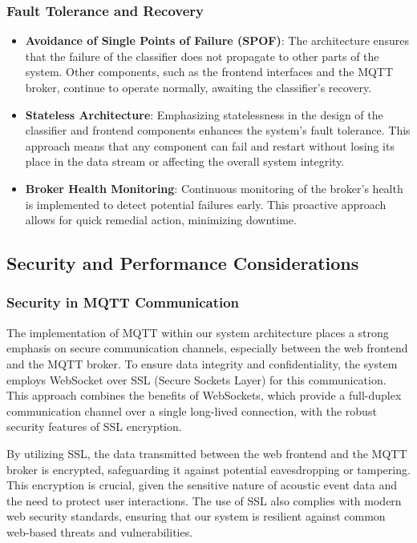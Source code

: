 \subsubsection{Fault Tolerance and Recovery}
\begin{itemize}
  \item \textbf{Avoidance of Single Points of Failure (SPOF)}: The architecture ensures that the failure of the classifier does not propagate to other parts of the system. Other components, such as the frontend interfaces and the MQTT broker, continue to operate normally, awaiting the classifier's recovery.
  \item \textbf{Stateless Architecture}: Emphasizing statelessness in the design of the classifier and frontend components enhances the system's fault tolerance. This approach means that any component can fail and restart without losing its place in the data stream or affecting the overall system integrity.
  \item \textbf{Broker Health Monitoring}: Continuous monitoring of the broker's health is implemented to detect potential failures early. This proactive approach allows for quick remedial action, minimizing downtime.
\end{itemize}

\subsection{Security and Performance Considerations}
\subsubsection{Security in MQTT Communication}
The implementation of MQTT within our system architecture places a strong emphasis on secure communication channels, especially between the web frontend and the MQTT broker. To ensure data integrity and confidentiality, the system employs WebSocket over SSL (Secure Sockets Layer) for this communication. This approach combines the benefits of WebSockets, which provide a full-duplex communication channel over a single long-lived connection, with the robust security features of SSL encryption.

By utilizing SSL, the data transmitted between the web frontend and the MQTT broker is encrypted, safeguarding it against potential eavesdropping or tampering. This encryption is crucial, given the sensitive nature of acoustic event data and the need to protect user interactions. The use of SSL also complies with modern web security standards, ensuring that our system is resilient against common web-based threats and vulnerabilities.

